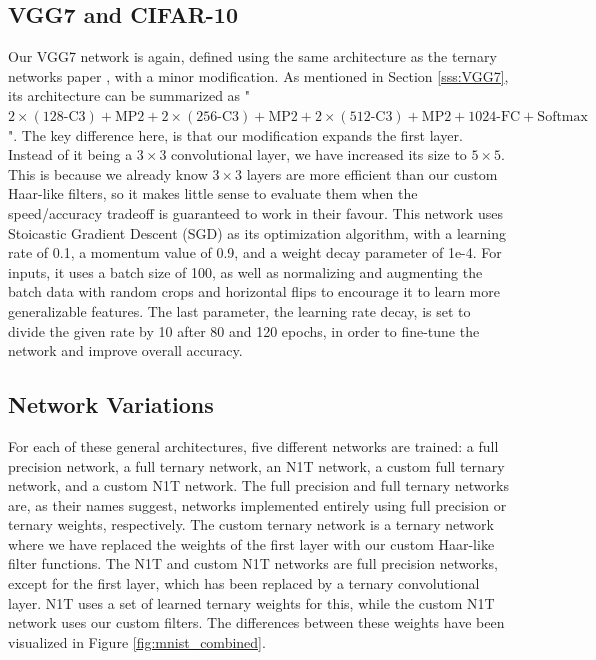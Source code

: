 \documentclass[11pt,a4paper,oldfontcommands]{memoir}
\begin{document}
\subsection{VGG7 and CIFAR-10}
Our VGG7 network is again, defined using the same architecture as the ternary networks paper \cite{ternary}, with a minor modification. As mentioned in Section \ref{sss:VGG7}, its architecture can be summarized as "$2 \times (\textrm{128-C3}) + \textrm{MP2} + 2 \times (\textrm{256-C3}) + \textrm{MP2} + 2 \times (\textrm{512-C3}) + \textrm{MP2} + \textrm{1024-FC} + \textrm{Softmax}$". The key difference here, is that our modification expands the first layer. Instead of it being a $3 \times 3$ convolutional layer, we have increased its size to $5 \times 5$. This is because we already know $3\times3$ layers are more efficient than our custom Haar-like filters, so it makes little sense to evaluate them when the speed/accuracy tradeoff is guaranteed to work in their favour. This network uses Stoicastic Gradient Descent (SGD) as its optimization algorithm, with a learning rate of 0.1, a momentum value of 0.9, and a weight decay parameter of 1e-4. For inputs, it uses a batch size of 100, as well as normalizing and augmenting the batch data with random crops and horizontal flips to encourage it to learn more generalizable features. The last parameter, the learning rate decay, is set to divide the given rate by 10 after 80 and 120 epochs, in order to fine-tune the network and improve overall accuracy.  

\subsection{Network Variations}
For each of these general architectures, five different networks are trained: a full precision network, a full ternary network, an N1T network, a custom full ternary network, and a custom N1T network. The full precision and full ternary networks are, as their names suggest, networks implemented entirely using full precision or ternary weights, respectively. The custom ternary network is a ternary network where we have replaced the weights of the first layer with our custom Haar-like filter functions. The N1T and custom N1T networks are full precision networks, except for the first layer, which has been replaced by a ternary convolutional layer. N1T uses a set of learned ternary weights for this, while the custom N1T network uses our custom filters. The differences between these weights have been visualized in Figure \ref{fig:mnist_combined}.
\end{document}
